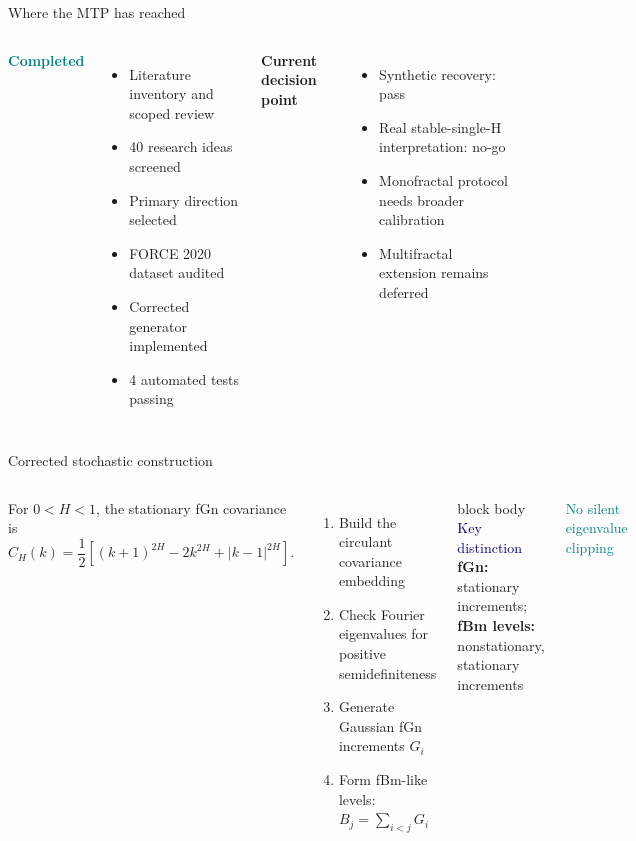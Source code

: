 \documentclass[aspectratio=169,11pt]{beamer}
\begin{document}
\begin{frame}{Where the MTP has reached}
\begin{columns}[T,onlytextwidth]
\textcolor{Teal}{\Large\bfseries Completed}
\begin{itemize}
  \item Literature inventory and scoped review
  \item 40 research ideas screened
  \item Primary direction selected
  \item FORCE 2020 dataset audited
  \item Corrected generator implemented
  \item 4 automated tests passing
\end{itemize}
\textcolor{Amber}{\Large\bfseries Current decision point}
\begin{itemize}
  \item Synthetic recovery: pass
  \item Real stable-single-H interpretation: no-go
  \item Monofractal protocol needs broader calibration
  \item Multifractal extension remains deferred
\end{itemize}
\end{columns}
\end{frame}

\begin{frame}{Corrected stochastic construction}
\begin{columns}[T,onlytextwidth]
\small
For $0<H<1$, the stationary fGn covariance is
\begin{equation*}
C_H(k)=\frac{1}{2}\left[(k+1)^{2H}-2k^{2H}+|k-1|^{2H}\right].
\end{equation*}
\vspace{0.15cm}
\begin{enumerate}
  \item Build the circulant covariance embedding
  \item Check Fourier eigenvalues for positive semidefiniteness
  \item Generate Gaussian fGn increments $G_i$
  \item Form fBm-like levels: $B_j=\sum_{i<j}G_i$
\end{enumerate}
\begin{beamercolorbox}[sep=0.3cm,wd=\textwidth]{block body}
\centering
{\textcolor{Navy}{\Large Key distinction}}\\[0.15cm]
\textbf{fGn:} stationary increments; \textbf{fBm levels:} nonstationary, stationary increments
\end{beamercolorbox}
\vspace{0.3cm}
\centering\textcolor{Teal}{\large No silent eigenvalue clipping}
\end{columns}
\end{frame}
\end{document}
